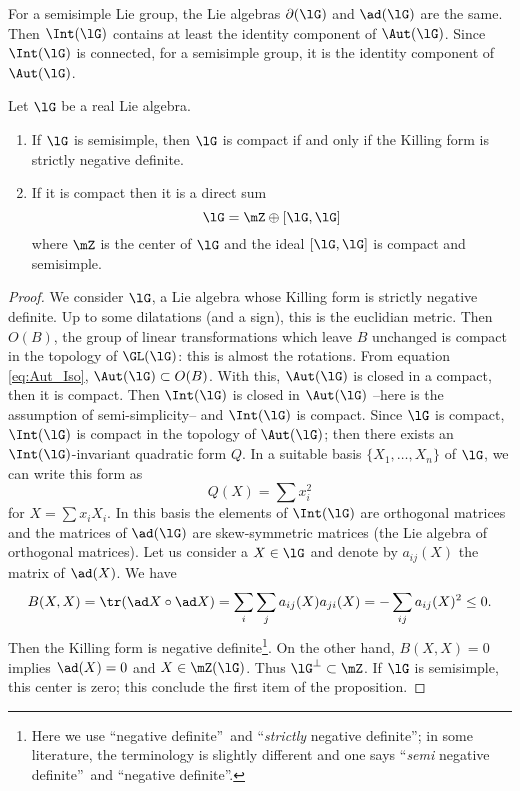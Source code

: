 \begin{theorem}
For a semisimple Lie group, the Lie algebras $\partial(\lG)$ and $\ad(\lG)$ are the same. Then $\Int(\lG)$ contains at least the identity component of $\Aut(\lG)$. Since $\Int(\lG)$ is connected, for a semisimple group, it is the identity component of $\Aut(\lG)$.

\begin{proposition}     \label{ProplGcompactKillNeg}\label{prop:compact_Killing}
	Let $\lG$ be a real Lie algebra.
	\begin{enumerate}
		\item If $\lG$ is semisimple, then $\lG$ is compact if and only if  the Killing form is strictly negative definite.
		\item If it is compact then it is a direct sum
		      \begin{equation}
			      \lG=\mZ\oplus [\lG,\lG]
		      \end{equation}
		      where $\mZ$ is the center of $\lG$ and the ideal $[\lG,\lG]$ is compact and semisimple.
	\end{enumerate}
\end{proposition}

\begin{proof}
	We consider $\lG$, a Lie algebra whose Killing form is strictly negative definite. Up to some dilatations (and a sign), this is the euclidian metric. Then $O(B)$, the group of linear transformations which leave $B$ unchanged is compact in the topology of $\GL(\lG)$: this is almost the rotations. From equation \eqref{eq:Aut_Iso}, $\Aut(\lG)\subset O(B)$. With this, $\Aut(\lG)$ is closed in a compact, then it is compact. Then $\Int(\lG)$ is closed in $\Aut(\lG)$ --here is the assumption of semi-simplicity-- and $\Int(\lG)$ is compact.
	Since $\lG$ is compact, $\Int(\lG)$ is compact in the topology of $\Aut(\lG)$; then there exists an $\Int(\lG)$-invariant quadratic form $Q$. In a suitable basis $\{X_1,\ldots,X_n\}$ of $\lG$, we can write this form as
	\[
		Q(X)=\sum x_i^2
	\]
	for $X=\sum x_iX_i$. In this basis the elements of $\Int(\lG)$ are orthogonal matrices and the matrices of $\ad(\lG)$ are skew-symmetric matrices (the Lie algebra of orthogonal matrices). Let us consider a $X\in\lG$ and denote by $a_{ij}(X)$ the matrix of $\ad(X)$. We have
	\begin{equation}
		\begin{split}
			B(X,X)=\tr(\ad X\circ\ad X)
			=\sum_i\sum_ja_{ij}(X)a_{ji}(X)
			=-\sum_{ij}a_{ij}(X)^2\leq 0.
		\end{split}
	\end{equation}
	Then the Killing form is negative definite\footnote{Here we use ``negative definite''\ and ``\emph{strictly} negative definite''; in some literature, the terminology is slightly different and one says ``\emph{semi} negative definite''\ and ``negative definite''.}. On the other hand, $B(X,X)=0$ implies $\ad(X)=0$ and $X\in\mZ(\lG)$. Thus $\lG^{\perp}\subset\mZ$. If $\lG$ is semisimple, this center is zero; this conclude the first item of the proposition.


\end{proof}
\end{theorem}
